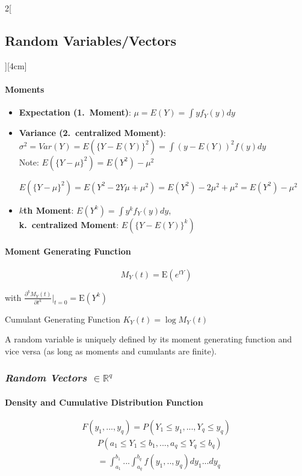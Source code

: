 \documentclass[8pt]{extarticle}
\begin{document}
\begin{multicols}{2}[\subsection{Random Variables/Vectors}][4cm]
\paragraph{Moments}

\begin{itemize}
\item \textbf{Expectation (1.\ Moment)}: $\mu = E(Y) = \int y f_Y(y)dy$
\item \textbf{Variance (2.\ centralized Moment)}: $\sigma^2 = Var(Y) = E(\{Y-E(Y)\}^2) = \int (y - E(Y))^2 f(y) dy$ \\
Note: $E(\{Y-\mu\}^2) = E(Y^2) - \mu^2$
\begin{Proof}
$E(\{Y-\mu\}^2) = E(Y^2 - 2Y\mu + \mu^2) = E(Y^2) - 2\mu^2 + \mu^2 = E(Y^2) - \mu^2$
\end{Proof}
\item \textbf{$k$th Moment}: $E(Y^k) = \int y^k f_Y(y) dy$,\\ \textbf{k.\ centralized Moment}: $E(\{Y-E(Y)\}^k)$
\end{itemize}

\paragraph{Moment Generating Function}

$$M_Y(t) = \mathrm{E}(e^{tY})$$

with $\frac{\partial^kM_Y(t)}{\partial t^k} \bigg|_{t = 0} = \mathrm{E}(Y^k)$ 

Cumulant Generating Function $K_Y(t) = \log M_Y(t)$

\noindent A random variable is uniquely defined by its moment generating function and vice versa (as long as moments and cumulants are finite).
  
\subsubsection*{\textit{Random Vectors $\in \mathbb{R}^q$}}

\paragraph{Density and Cumulative Distribution Function}

$$F(y_1, ..., y_q) = P(Y_1 \leq y_1, ..., Y_q \leq y_q)$$
\begin{align*}
& P(a_1 \leq Y_1 \leq b_1, ..., a_q \leq Y_q \leq b_q) \\
& = \int_{a_1}^{b_1} ...\int_{a_q}^{b_q} f(y_1, .., y_q)dy_1...dy_q
\end{align*}


\end{multicols}
\end{document}
